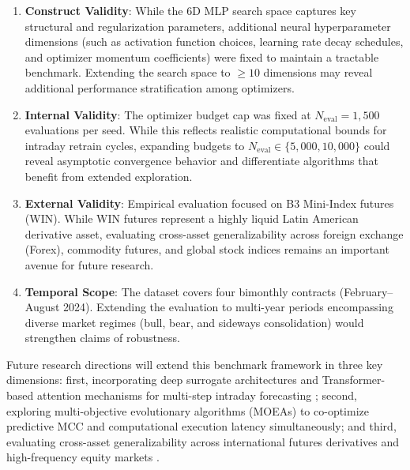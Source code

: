 \begin{enumerate}
    \item \textbf{Construct Validity}: While the 6D MLP search space captures key structural and regularization parameters, additional neural hyperparameter dimensions (such as activation function choices, learning rate decay schedules, and optimizer momentum coefficients) were fixed to maintain a tractable benchmark. Extending the search space to $\geq 10$ dimensions may reveal additional performance stratification among optimizers.
    \item \textbf{Internal Validity}: The optimizer budget cap was fixed at $N_{\text{eval}} = 1{,}500$ evaluations per seed. While this reflects realistic computational bounds for intraday retrain cycles, expanding budgets to $N_{\text{eval}} \in \{5{,}000, 10{,}000\}$ could reveal asymptotic convergence behavior and differentiate algorithms that benefit from extended exploration.
    \item \textbf{External Validity}: Empirical evaluation focused on B3 Mini-Index futures (WIN). While WIN futures represent a highly liquid Latin American derivative asset, evaluating cross-asset generalizability across foreign exchange (Forex), commodity futures, and global stock indices remains an important avenue for future research.
    \item \textbf{Temporal Scope}: The dataset covers four bimonthly contracts (February--August 2024). Extending the evaluation to multi-year periods encompassing diverse market regimes (bull, bear, and sideways consolidation) would strengthen claims of robustness.
\end{enumerate}

Future research directions will extend this benchmark framework in three key dimensions: first, incorporating deep surrogate architectures and Transformer-based attention mechanisms for multi-step intraday forecasting \cite{al_bannoud2026accelerating}; second, exploring multi-objective evolutionary algorithms (MOEAs) to co-optimize predictive MCC and computational execution latency simultaneously; and third, evaluating cross-asset generalizability across international futures derivatives and high-frequency equity markets \cite{bashir2026evobagnet}.
